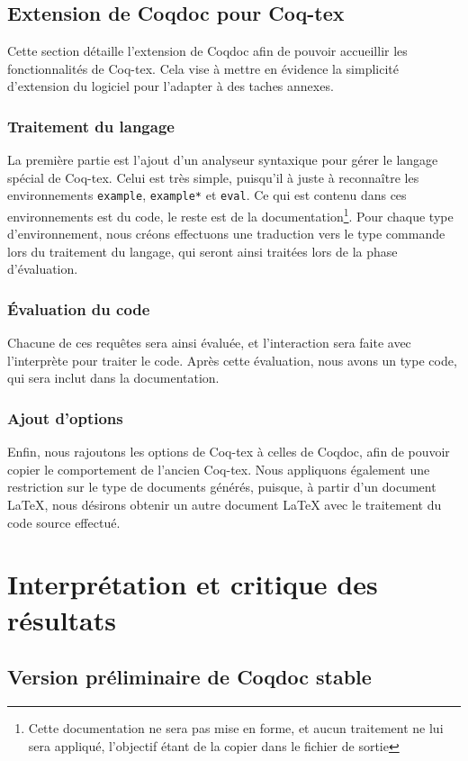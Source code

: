 \documentclass[a4paper, 11pt]{report}
\begin{document}
    \clearpage
    \subsection{Extension de Coqdoc pour Coq-tex}
    Cette section détaille l'extension de Coqdoc afin de pouvoir accueillir
    les fonctionnalités de Coq-tex. Cela vise à mettre en évidence la simplicité
    d'extension du logiciel pour l'adapter à des taches annexes.
    \subsubsection{Traitement du langage}
    La première partie est l'ajout d'un analyseur syntaxique pour gérer le
    langage spécial de Coq-tex. Celui est très simple, puisqu'il à juste
    à reconnaître les environnements \texttt{example}, \texttt{example*} et
    \texttt{eval}. Ce qui est contenu dans ces environnements est du code, le
    reste est de la documentation\footnote{Cette documentation ne sera pas
    mise en forme, et aucun traitement ne lui sera appliqué, l'objectif étant
    de la copier dans le fichier de sortie}.
    Pour chaque type d'environnement, nous créons effectuons une traduction
    vers le type commande lors du traitement du langage, qui seront ainsi
    traitées lors de la phase d'évaluation.

    \subsubsection{Évaluation du code}
    Chacune de ces requêtes sera ainsi évaluée, et l'interaction sera faite avec
    l'interprète pour traiter le code. Après cette évaluation, nous avons
    un type code, qui sera inclut dans la documentation.
    \subsubsection{Ajout d'options}
    Enfin, nous rajoutons les options de Coq-tex à celles de Coqdoc, afin
    de pouvoir copier le comportement de l'ancien Coq-tex. Nous appliquons
    également une restriction sur le type de documents générés, puisque, à
    partir d'un document LaTeX, nous désirons obtenir un autre document LaTeX avec
    le traitement du code source effectué.
    \clearpage
  \section{Interprétation et critique des résultats}
    \subsection{Version préliminaire de Coqdoc stable}
\end{document}
